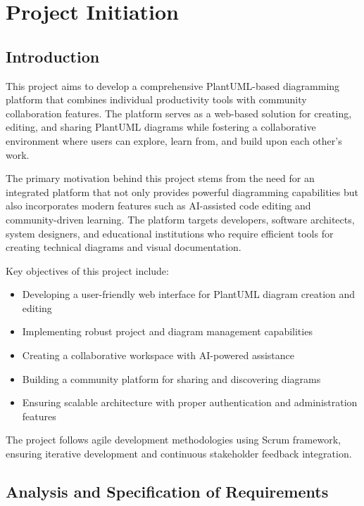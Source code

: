 
\chapter{Project Initiation}
\minitoc

\section{Introduction}

This project aims to develop a comprehensive PlantUML-based diagramming platform that combines individual productivity tools with community collaboration features. The platform serves as a web-based solution for creating, editing, and sharing PlantUML diagrams while fostering a collaborative environment where users can explore, learn from, and build upon each other's work.

The primary motivation behind this project stems from the need for an integrated platform that not only provides powerful diagramming capabilities but also incorporates modern features such as AI-assisted code editing and community-driven learning. The platform targets developers, software architects, system designers, and educational institutions who require efficient tools for creating technical diagrams and visual documentation.

Key objectives of this project include:
\begin{itemize}
    \item Developing a user-friendly web interface for PlantUML diagram creation and editing
    \item Implementing robust project and diagram management capabilities
    \item Creating a collaborative workspace with AI-powered assistance
    \item Building a community platform for sharing and discovering diagrams
    \item Ensuring scalable architecture with proper authentication and administration features
\end{itemize}

The project follows agile development methodologies using Scrum framework, ensuring iterative development and continuous stakeholder feedback integration.

\section{Analysis and Specification of Requirements}

